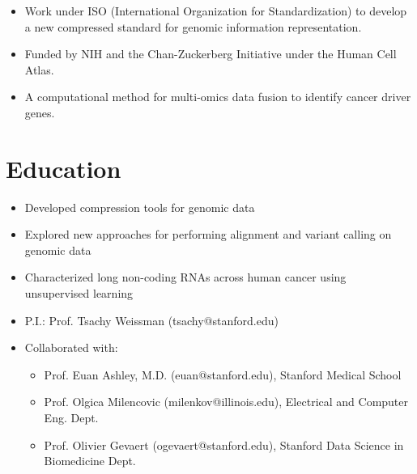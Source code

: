\documentclass[11pt,a4paper,sans]{moderncv}        %
\begin{document}
\vspace{10pt}
\begin{itemize}
\item Work under ISO (International Organization for Standardization) to develop a new compressed standard for genomic information representation.
\item Funded by NIH and the Chan-Zuckerberg Initiative under the Human Cell Atlas.
\end{itemize}


\vspace{10pt}
\begin{itemize}
\item A computational method for multi-omics data fusion to identify cancer driver genes.
\end{itemize}





\section{Education}




\begin{itemize}
 \item Developed compression tools for genomic data
 \item Explored new approaches for performing alignment and variant calling on genomic data
 \item Characterized long non-coding RNAs across human cancer using unsupervised learning
  \item P.I.: Prof. Tsachy Weissman (tsachy@stanford.edu)
  \item Collaborated with: 
  \begin{itemize}
  \item Prof. Euan Ashley, M.D. (euan@stanford.edu), Stanford Medical School
  \item Prof. Olgica Milencovic (milenkov@illinois.edu), Electrical and Computer Eng. Dept.
  \item Prof. Olivier Gevaert (ogevaert@stanford.edu), Stanford Data Science in Biomedicine Dept.
  \end{itemize}
\end{itemize}
\end{document}
